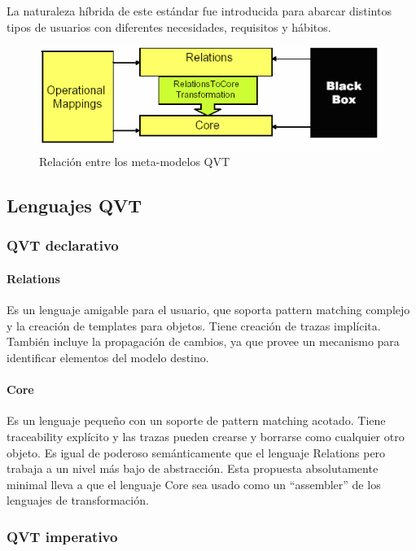 \documentclass[a4paper,12pt,oneside,spanish]{book}
\begin{document}
La naturaleza híbrida de este estándar fue introducida para abarcar distintos tipos de usuarios con diferentes necesidades, requisitos y hábitos.


\begin{figure}[hbtp]
\centering
\includegraphics[scale=.65]{./img/metamodelosQVT}
\caption{Relación entre los meta-modelos QVT}
\label{QVTmetamodelos}
\end{figure}


\subsection{Lenguajes QVT}


\subsubsection{QVT declarativo}


\paragraph{Relations}

Es un lenguaje amigable para el usuario, que soporta pattern matching complejo y la creación de templates para objetos. Tiene creación de trazas implícita. También incluye la propagación de cambios, ya que provee un mecanismo para identificar elementos del modelo destino. 

\paragraph{Core}

Es un lenguaje pequeño con un soporte de pattern matching acotado. Tiene traceability explícito y las trazas pueden crearse y borrarse como cualquier otro objeto. Es igual de poderoso semánticamente que el lenguaje Relations pero trabaja a un nivel más bajo de abstracción. Esta propuesta absolutamente minimal lleva a que el lenguaje Core sea usado como un “assembler” de los lenguajes de transformación.


\subsubsection{QVT imperativo}
\end{document}
